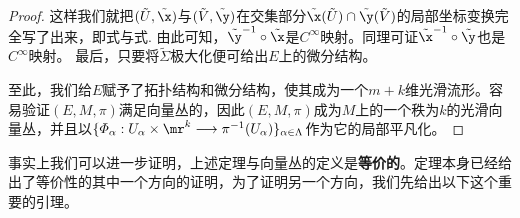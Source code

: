 \begin{proof}
  这样我们就把$(\tilde{  U  },\tilde{  \x  })$与$(\tilde{  V  },\tilde{  \y  })$在交集部分$\tilde{  \x  }(\tilde{  U  })\cap \tilde{  \y  }(\tilde{  V  })$的局部坐标变换完全写了出来，即式与式. 由此可知，$\tilde{  \y  }^{-1}\circ\tilde{  \x  }$是$C^{\infty}$映射。同理可证$\tilde{  \x  }^{-1}\circ \tilde{  \y }$也是$C^{\infty}$映射。
  最后，只要将$\tilde{  \Sigma }$极大化便可给出$E$上的微分结构。
	
	至此，我们给$E$赋予了拓扑结构和微分结构，使其成为一个$m+k$维光滑流形。容易验证$(E,M,\pi)$满足向量丛的，因此$(E,M,\pi)$成为$M$上的一个秩为$k$的光滑向量丛，并且以$\{\varPhi_{\alpha}:U_{\alpha}\times \mr^{k}\longrightarrow \pi^{-1}(U_{\alpha}) \}_{\alpha\in \Lambda}$作为它的局部平凡化。	
\end{proof}

事实上我们可以进一步证明，上述定理与向量丛的定义是\textbf{等价的}。定理本身已经给出了等价性的其中一个方向的证明，为了证明另一个方向，我们先给出以下这个重要的引理。

